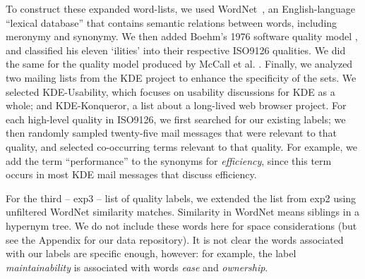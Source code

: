 \documentclass{acm_proc_article-sp}
\begin{document}

To construct these expanded word-lists, we used WordNet~\cite{Fellbaum1998}, an English-language ``lexical database'' that contains semantic relations between words, including meronymy and synonymy. We then added Boehm’s 1976 software quality model \cite{Boehm+:1976:ICSE}, and classified his eleven ‘ilities’ into their respective ISO9126 qualities. We did the same for the quality model produced by McCall et al. \cite{mccall1977}. Finally, we analyzed two mailing lists from the KDE project to enhance the specificity of the sets. We selected KDE-Usability, which focuses on usability discussions for KDE as a whole; and KDE-Konqueror, a list about a long-lived web browser project. For each high-level quality in ISO9126, we first searched for our existing labels; we then randomly sampled twenty-five mail messages that were relevant to that quality, and selected co-occurring terms relevant to that quality. For example, we add the term ``performance'' to the synonyms for \emph{efficiency}, since this term occurs in most KDE mail messages that discuss efficiency.

For the third -- \textsf{exp3} -- list of quality labels, we extended the list from \textsf{exp2} using unfiltered WordNet similarity matches. Similarity in WordNet means siblings in a hypernym tree. We do not include these words here for space considerations (but see the Appendix for our data repository). It is not clear the words associated with our labels are specific enough, however: for example, the label \emph{maintainability} is associated with words \emph{ease} and \emph{ownership}.
\end{document}
